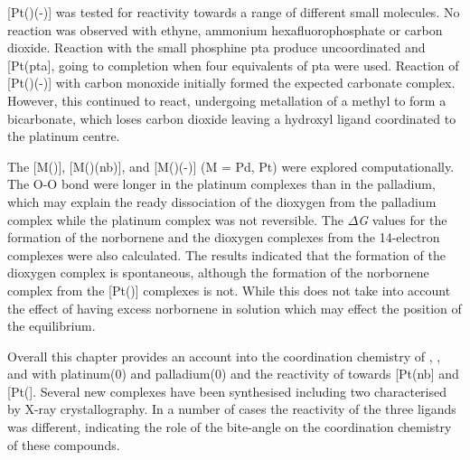 [Pt(\tButhixantphos)(-)] was tested for reactivity towards a range of different small molecules.  No reaction was observed with ethyne, ammonium hexafluorophosphate or carbon dioxide.  Reaction with the small phosphine \gls{pta} produce uncoordinated \tButhixantphos{} and [Pt(pta], going to completion when four equivalents of pta were used.  Reaction of [Pt(\tButhixantphos)(-)] with carbon monoxide initially formed the expected carbonate complex.  However, this continued to react, undergoing metallation of a \tBu{} methyl to form a bicarbonate, which loses carbon dioxide leaving a hydroxyl ligand coordinated to the platinum centre.  

The [M(\tBuxantphos)], [M(\tBuxantphos)(nb)], and [M(\tBuxantphos)(-)] (M = Pd, Pt) were explored computationally.  The O-O bond were longer in the platinum complexes than in the palladium, which may explain the ready dissociation of the dioxygen from the palladium complex while the platinum complex was not reversible.  The $\Delta$\emph{G} values for the formation of the norbornene and the dioxygen complexes from the 14-electron complexes were also calculated.  The results indicated that the formation of the dioxygen complex is spontaneous, although the formation of the norbornene complex from the [Pt(\tBuxantphos)] complexes is not.  While this does not take into account the effect of having excess norbornene in solution which may effect the position of the equilibrium.  

Overall this chapter provides an account into the coordination chemistry of \tBusixantphos, \tButhixantphos, and \tBuxantphos{} with platinum(0) and palladium(0) and the reactivity of \Phthixantphos{} towards [Pt(nb] and [Pt(].  Several new complexes have been synthesised including two characterised by X-ray crystallography.  In a number of cases the reactivity of the three \tBuxantphos{} ligands was different, indicating the role of the bite-angle on the coordination chemistry of these compounds.  









